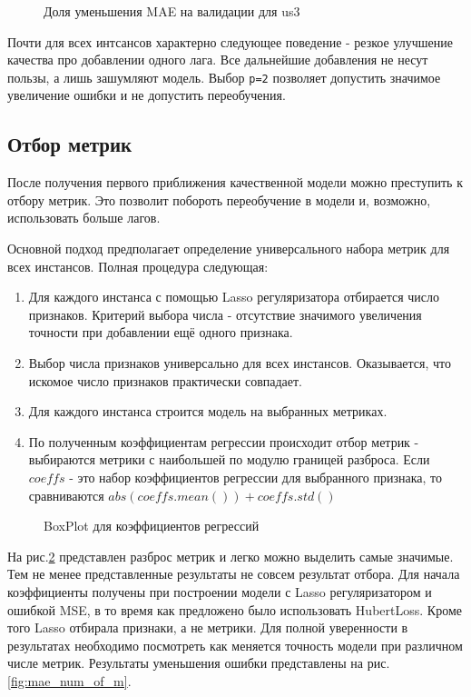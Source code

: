 \documentclass[14pt, a4paper]{extarticle}
\begin{document}
	\begin{figure}[h]
		\centerline{}
		\caption{Доля уменьшения MAE на валидации для us3}
		\label{fig:p-selection}
	\end{figure}
	Почти для всех интсансов характерно следующее поведение - резкое улучшение качества про добавлении одного лага.
	Все дальнейшие добавления не несут пользы, а лишь зашумляют модель.
	Выбор \texttt{p=2} позволяет допустить значимое увеличение ошибки и не допустить переобучения. 
	
	\subsection{Отбор метрик}
	После получения первого приближения качественной модели можно преступить к отбору метрик.
	Это позволит побороть переобучение в модели и, возможно, использовать больше лагов.	
	
	Основной подход предполагает определение универсального набора метрик для всех инстансов. Полная процедура следующая:
	\begin{enumerate}
		\item Для каждого инстанса с помощью Lasso регуляризатора отбирается число признаков. 
		Критерий выбора числа - отсутствие значимого увеличения точности при добавлении ещё одного признака.
		\item Выбор числа признаков универсально для всех инстансов. 
		Оказывается, что искомое число признаков практически совпадает.
		\item Для каждого инстанса строится модель на выбранных метриках.
		\item По полученным коэффициентам регрессии происходит отбор метрик - выбираются метрики с наибольшей по модулю границей разброса.
		Если $coeffs$ - это набор коэффициентов регрессии для выбранного признака, то сравниваются 
		$abs(coeffs.mean()) + coeffs.std()$ 
	\end{enumerate}

	\begin{figure}[!htb]
		\centerline{}
		\caption{BoxPlot для коэффициентов регрессий}
		\label{fig:coeffs_boxplot}
	\end{figure}
	На рис.\ref{fig:coeffs_boxplot} представлен разброс метрик и легко можно выделить самые значимые.
	Тем не менее представленные результаты не совсем результат отбора. 
	Для начала коэффициенты получены при построении модели с Lasso регуляризатором и ошибкой MSE, в то время как предложено было использовать HubertLoss.
	Кроме того Lasso отбирала признаки, а не метрики.
	Для полной уверенности в результатах необходимо посмотреть как меняется точность модели при различном числе метрик.
	Результаты уменьшения ошибки представлены на рис.\ref{fig:mae_num_of_m}.
	
\end{document}
